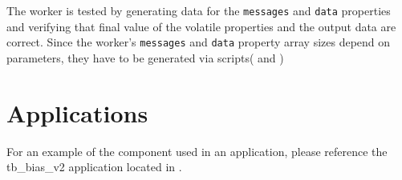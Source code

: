 \begin{flushleft}

The {\comp} worker is tested by generating data for the \texttt{messages} and \texttt{data} properties and verifying that final value of the volatile properties and the output data are correct. Since the {\comp} worker's \texttt{messages} and \texttt{data} property array sizes depend on parameters, they have to be generated via scripts( and )
\newline


\end{flushleft}

\section*{Applications}
\begin{flushleft}

For an example of the {\comp} component used in an application, please reference the
tb\_bias\_v2 application located in .

\end{flushleft}



